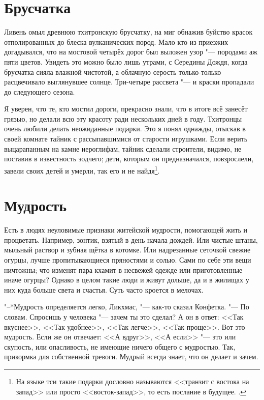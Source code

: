 \section{Брусчатка}

Ливень омыл древнюю тхитронскую брусчатку, на миг обнажив буйство красок отполированных до блеска вулканических пород.
Мало кто из приезжих догадывался, что на мостовой четырёх дорог был выложен узор "--- породами аж пяти цветов.
Увидеть это можно было лишь утрами, с Середины Дождя, когда брусчатка сияла влажной чистотой, а облачную серость только-только расцвечивало выглянувшее солнце.
Три-четыре рассвета "--- и краски пропадали до следующего сезона.

Я уверен, что те, кто мостил дороги, прекрасно знали, что в итоге всё занесёт грязью, но делали всю эту красоту ради нескольких дней в году.
Тхитронцы очень любили делать неожиданные подарки.
Это я понял однажды, отыскав в своей комнате тайник с рассыпавшимися от старости игрушками.
Если верить выцарапанным на камне иероглифам, тайник сделали строители, видимо, не поставив в известность зодчего;
дети, которым он предназначался, повзрослели, завели своих детей и умерли, так его и не найдя\footnote
{На языке тси такие подарки дословно называются <<транзит с востока на запад>> или просто <<восток-запад>>, то есть послание в будущее. \authornote.}.

\section{Мудрость}

Есть в людях неуловимые признаки житейской мудрости, помогающей жить и процветать.
Например, зонтик, взятый в день начала дождей.
Или чистые штаны, мыльный раствор и зубная щётка в котомке.
Или надрезанные сеточкой свежие огурцы, лучше пропитывающиеся пряностями и солью.
Сами по себе эти вещи ничтожны;
что изменят пара кхамит в несвежей одежде или приготовленные иначе огурцы?
Однако в целом такие люди и живут дольше, да и в жилищах у них куда больше света и счастья.
Суть часто кроется в мелочах.

"--*Мудрость определяется легко, Ликхмас, "--- как-то сказал Конфетка.
"--- По словам.
Спросишь у человека "--- зачем ты это сделал?
А он в ответ: <<Так вкуснее>>, <<Так удобнее>>, <<Так легче>>, <<Так проще>>.
Вот это мудрость.
Если же он отвечает: <<А вдруг>>, <<А если>> "--- это или скупость, или опасливость, не имеющие ничего общего с мудростью.
Так, прикормка для собственной тревоги.
Мудрый всегда знает, что он делает и зачем.

